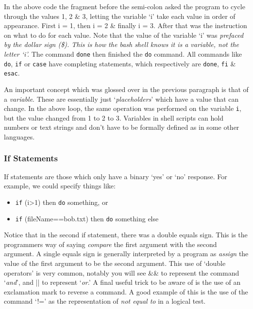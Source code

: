 \documentclass[a4paper,12pt,twoside]{memoir}
\begin{document}
\begin{information}
In the above code the fragment before the semi-colon asked the program to cycle through the values 1, 2 \& 3, letting the variable `i' take each value in order of appearance.
First i = 1, then i = 2 \& finally i = 3.
After that was the instruction on what to do for each value.
Note that the value of the variable `i' was \textit{prefaced by the dollar sign (\$).
This is how the bash shell knows it is a variable, not the letter `i'.}
The command \texttt{done} then finished the \texttt{do} command.
All commands like \texttt{do}, \texttt{if} or \texttt{case} have completing statements, which respectively are \texttt{done}, \texttt{fi} \& \texttt{esac}.

An important concept which was glossed over in the previous paragraph is that of a \textit{variable}.
These are essentially just `\textit{placeholders}' which have a value that can change.
In the above loop, the same operation was performed on the variable \texttt{i}, but the value changed from 1 to 2 to 3.
Variables in shell scripts can hold numbers or text strings and don't have to be formally defined as in some other languages.
\end{information}

\subsubsection{If Statements}
If statements are those which only have a binary `yes' or `no' response.
For example, we could specify things like:
\begin{itemize}
\item \texttt{if} (i>1) then \texttt{do} something, or
\item \texttt{if} (fileName==bob.txt) then \texttt{do} something else
\end{itemize}

\begin{information}
Notice that in the second if statement, there was a double equals sign.
This is the programmers way of saying \textit{compare} the first argument with the second argument.
A single equals sign is generally interpreted by a program as \textit{assign} the value of the first argument to be the second argument.
This use of `double operators' is very common, notably you will see \&\& to represent the command `\textit{and}', and || to represent `\textit{or}.'
A final useful trick to be aware of is the use of an exclamation mark to reverse a command.
A good example of this is the use of the command `!=' as the representation of \textit{not equal to} in a logical test.
\end{information}
\end{document}
